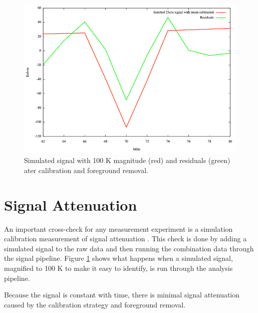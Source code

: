 \begin{figure}[htb]
\begin{center}
\includegraphics[width=0.9\linewidth]{Data_analysis/figures/100_K_21cm_signal.png}
\caption{Simulated \cm signal with 100 K magnitude (red) and residuals (green) ater calibration and foreground removal. }
\label{Fig:100K_sim}
\end{center}
\end{figure}

\section{\cm Signal Attenuation}
An important cross-check for any \cm measurement experiment is a simulation calibration measurement of signal attenuation \cite{paciga_2013}. This check is done by adding a simulated \cm signal to the raw data and then running the combination data through the signal pipeline. Figure \ref{Fig:100K_sim} shows what happens when a simulated \cm signal, magnified to 100 K to make it easy to identify, is run through the analysis pipeline. 

Because the \cm signal is constant with time, there is minimal signal attenuation caused by the calibration strategy and foreground removal. 


